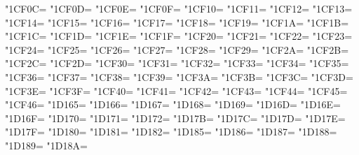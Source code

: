 \XeTeXcharclass"1CF0C=\KclassCM
\XeTeXcharclass"1CF0D=\KclassCM
\XeTeXcharclass"1CF0E=\KclassCM
\XeTeXcharclass"1CF0F=\KclassCM
\XeTeXcharclass"1CF10=\KclassCM
\XeTeXcharclass"1CF11=\KclassCM
\XeTeXcharclass"1CF12=\KclassCM
\XeTeXcharclass"1CF13=\KclassCM
\XeTeXcharclass"1CF14=\KclassCM
\XeTeXcharclass"1CF15=\KclassCM
\XeTeXcharclass"1CF16=\KclassCM
\XeTeXcharclass"1CF17=\KclassCM
\XeTeXcharclass"1CF18=\KclassCM
\XeTeXcharclass"1CF19=\KclassCM
\XeTeXcharclass"1CF1A=\KclassCM
\XeTeXcharclass"1CF1B=\KclassCM
\XeTeXcharclass"1CF1C=\KclassCM
\XeTeXcharclass"1CF1D=\KclassCM
\XeTeXcharclass"1CF1E=\KclassCM
\XeTeXcharclass"1CF1F=\KclassCM
\XeTeXcharclass"1CF20=\KclassCM
\XeTeXcharclass"1CF21=\KclassCM
\XeTeXcharclass"1CF22=\KclassCM
\XeTeXcharclass"1CF23=\KclassCM
\XeTeXcharclass"1CF24=\KclassCM
\XeTeXcharclass"1CF25=\KclassCM
\XeTeXcharclass"1CF26=\KclassCM
\XeTeXcharclass"1CF27=\KclassCM
\XeTeXcharclass"1CF28=\KclassCM
\XeTeXcharclass"1CF29=\KclassCM
\XeTeXcharclass"1CF2A=\KclassCM
\XeTeXcharclass"1CF2B=\KclassCM
\XeTeXcharclass"1CF2C=\KclassCM
\XeTeXcharclass"1CF2D=\KclassCM
\XeTeXcharclass"1CF30=\KclassCM
\XeTeXcharclass"1CF31=\KclassCM
\XeTeXcharclass"1CF32=\KclassCM
\XeTeXcharclass"1CF33=\KclassCM
\XeTeXcharclass"1CF34=\KclassCM
\XeTeXcharclass"1CF35=\KclassCM
\XeTeXcharclass"1CF36=\KclassCM
\XeTeXcharclass"1CF37=\KclassCM
\XeTeXcharclass"1CF38=\KclassCM
\XeTeXcharclass"1CF39=\KclassCM
\XeTeXcharclass"1CF3A=\KclassCM
\XeTeXcharclass"1CF3B=\KclassCM
\XeTeXcharclass"1CF3C=\KclassCM
\XeTeXcharclass"1CF3D=\KclassCM
\XeTeXcharclass"1CF3E=\KclassCM
\XeTeXcharclass"1CF3F=\KclassCM
\XeTeXcharclass"1CF40=\KclassCM
\XeTeXcharclass"1CF41=\KclassCM
\XeTeXcharclass"1CF42=\KclassCM
\XeTeXcharclass"1CF43=\KclassCM
\XeTeXcharclass"1CF44=\KclassCM
\XeTeXcharclass"1CF45=\KclassCM
\XeTeXcharclass"1CF46=\KclassCM
\XeTeXcharclass"1D165=\KclassCM
\XeTeXcharclass"1D166=\KclassCM
\XeTeXcharclass"1D167=\KclassCM
\XeTeXcharclass"1D168=\KclassCM
\XeTeXcharclass"1D169=\KclassCM
\XeTeXcharclass"1D16D=\KclassCM
\XeTeXcharclass"1D16E=\KclassCM
\XeTeXcharclass"1D16F=\KclassCM
\XeTeXcharclass"1D170=\KclassCM
\XeTeXcharclass"1D171=\KclassCM
\XeTeXcharclass"1D172=\KclassCM
\XeTeXcharclass"1D17B=\KclassCM
\XeTeXcharclass"1D17C=\KclassCM
\XeTeXcharclass"1D17D=\KclassCM
\XeTeXcharclass"1D17E=\KclassCM
\XeTeXcharclass"1D17F=\KclassCM
\XeTeXcharclass"1D180=\KclassCM
\XeTeXcharclass"1D181=\KclassCM
\XeTeXcharclass"1D182=\KclassCM
\XeTeXcharclass"1D185=\KclassCM
\XeTeXcharclass"1D186=\KclassCM
\XeTeXcharclass"1D187=\KclassCM
\XeTeXcharclass"1D188=\KclassCM
\XeTeXcharclass"1D189=\KclassCM
\XeTeXcharclass"1D18A=\KclassCM
